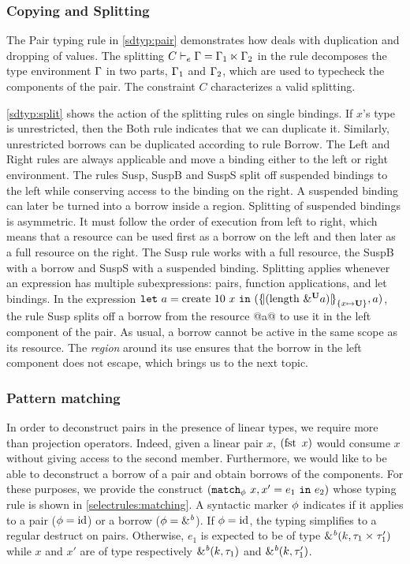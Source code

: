 \subsubsection{Copying and Splitting}
\label{sdtyping:split}

The {\sc Pair} typing rule in \cref{sdtyp:pair} demonstrates how \lang
deals with duplication and dropping of values.
The splitting $\lsplit{C}{\E}{\E_1}{\E_2}$ in the rule decomposes the
type environment $\E$ in two parts, $\E_1$ and $\E_2$, which are used
to typecheck the components of the pair.
The constraint $C$ characterizes a valid  splitting.

\cref{sdtyp:split} shows the action of the splitting rules on single
bindings. If $x$'s type is unrestricted, then
the {\sc Both} rule indicates that we can duplicate it.
Similarly, unrestricted borrows can be duplicated according to rule
{\sc Borrow}.
The {\sc Left} and {\sc Right} rules are always applicable and move a binding
either to the left or right environment.
The rules {\sc Susp}, {\sc SuspB} and {\sc SuspS}
split off suspended bindings to
the left while conserving access to the binding on the right.
A suspended binding can later be turned
into a borrow inside a region. Splitting of suspended bindings is
asymmetric. It must follow the order of execution from left to right,
which means that a resource can be used first as a borrow on the left
and then later as a full resource on the right. The {\sc Susp} rule
works with a full resource, the {\sc SuspB}
with a borrow and {\sc SuspS} with a suspended binding.
%
Splitting applies whenever an
expression has multiple subexpressions:  pairs, function applications,
and let bindings. In the
expression
$\letin{a}{\text{create}\ 10\ x}
{\introPair{\region[{}]{\Sone x\IBORROW}{\app{\text{length}}{\borrow[\IBORROW]{a}}}}{a}}$,
the rule {\sc Susp} splits off a borrow from  the resource
@a@ to use it in the left component of the pair.
As usual, a borrow cannot be active in the same scope as its resource.
The \emph{region} around its use ensures that the borrow in the left component does not
escape, which brings us to the next topic.


\subsubsection{Pattern matching}
\label{sdtyping:matching}

In order to deconstruct pairs in the presence of linear types, we require
more than projection operators. Indeed, given a linear pair $x$,
$\app{\operatorname{fst}}{x}$ would consume $x$ without giving access to the second
member.
Furthermore, we would like to be able to deconstruct a borrow of a pair
and obtain borrows of the components.
For these purposes, we provide the construct
$(\matchin{x,x'}{e_1}{e_2})$ whose
typing rule is shown in \cref{selectrules:matching}.
A syntactic marker $\etransfm$ indicates if it applies to
a pair ($\etransfm = \operatorname{id}$) or a borrow ($\etransfm = \&^\BORROW$).
If $\etransfm = \operatorname{id}$, the typing simplifies to
a regular destruct on pairs.
Otherwise, $e_1$ is expected to be of type
$\borrowty{k}{\tyPair{\tau_1}{\tau'_1}}$
while $x$ and $x'$ are of type respectively
$\borrowty{k}{\tau_1}$ and $\borrowty{k}{\tau'_1}$.

